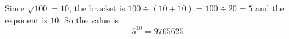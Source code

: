 Since $\sqrt{100}=10$, the bracket is $100\div(10+10)=100\div20=5$ and the exponent is $10$. So the value is
\[
5^{10}=\boxed{9765625}.
\]

